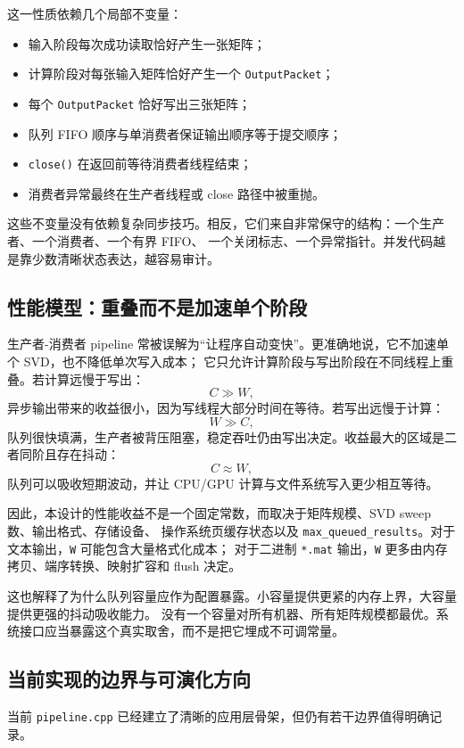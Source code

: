 这一性质依赖几个局部不变量：

\begin{itemize}
    \item 输入阶段每次成功读取恰好产生一张矩阵；
    \item 计算阶段对每张输入矩阵恰好产生一个 \texttt{OutputPacket}；
    \item 每个 \texttt{OutputPacket} 恰好写出三张矩阵；
    \item 队列 FIFO 顺序与单消费者保证输出顺序等于提交顺序；
    \item \texttt{close()} 在返回前等待消费者线程结束；
    \item 消费者异常最终在生产者线程或 close 路径中被重抛。
\end{itemize}

这些不变量没有依赖复杂同步技巧。相反，它们来自非常保守的结构：一个生产者、一个消费者、一个有界 FIFO、
一个关闭标志、一个异常指针。并发代码越是靠少数清晰状态表达，越容易审计。

\subsection{性能模型：重叠而不是加速单个阶段}

生产者-消费者 pipeline 常被误解为“让程序自动变快”。更准确地说，它不加速单个 SVD，也不降低单次写入成本；
它只允许计算阶段与写出阶段在不同线程上重叠。若计算远慢于写出：
\[
    C \gg W,
\]
异步输出带来的收益很小，因为写线程大部分时间在等待。若写出远慢于计算：
\[
    W \gg C,
\]
队列很快填满，生产者被背压阻塞，稳定吞吐仍由写出决定。收益最大的区域是二者同阶且存在抖动：
\[
    C \approx W,
\]
队列可以吸收短期波动，并让 CPU/GPU 计算与文件系统写入更少相互等待。

因此，本设计的性能收益不是一个固定常数，而取决于矩阵规模、SVD sweep 数、输出格式、存储设备、
操作系统页缓存状态以及 \texttt{max\_queued\_results}。对于文本输出，\texttt{W} 可能包含大量格式化成本；
对于二进制 \texttt{*.mat} 输出，\texttt{W} 更多由内存拷贝、端序转换、映射扩容和 flush 决定。

这也解释了为什么队列容量应作为配置暴露。小容量提供更紧的内存上界，大容量提供更强的抖动吸收能力。
没有一个容量对所有机器、所有矩阵规模都最优。系统接口应当暴露这个真实取舍，而不是把它埋成不可调常量。

\subsection{当前实现的边界与可演化方向}

当前 \texttt{pipeline.cpp} 已经建立了清晰的应用层骨架，但仍有若干边界值得明确记录。

